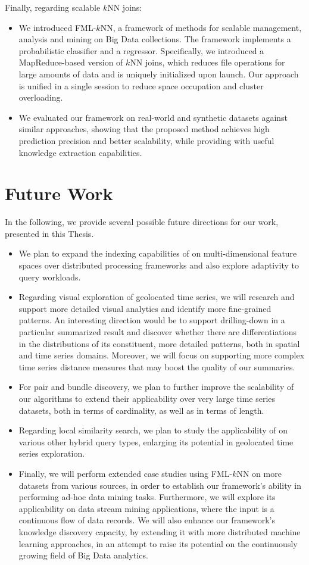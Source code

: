 Finally, regarding scalable $k$NN joins:
\begin{itemize}
	\item We introduced FML-$k$NN, a framework of methods for scalable management, analysis and mining on Big Data collections. The framework implements a probabilistic classifier and a regressor. Specifically, we introduced a MapReduce-based version of $k$NN joins, which reduces file operations for large amounts of data and is uniquely initialized upon launch. Our approach is unified in a single session to reduce space occupation and cluster overloading.
	\item We evaluated our framework on real-world and synthetic datasets against similar approaches, showing that the proposed method achieves high prediction precision and better scalability, while providing with useful knowledge extraction capabilities.
\end{itemize}

\section{Future Work}
\label{sec:future}
In the following, we provide several possible future directions for our work, presented in this Thesis.

\begin{itemize}
	\item We plan to expand the indexing capabilities of \btsr on multi-dimensional feature spaces over distributed processing frameworks and also explore adaptivity to query workloads.
	\item Regarding visual exploration of geolocated time series, we will research and support more detailed visual analytics and identify more fine-grained patterns. An interesting direction would be to support drilling-down in a particular summarized result and discover whether there are differentiations in the distributions of its constituent, more detailed patterns, both in spatial and time series domains. Moreover, we will focus on supporting more complex time series distance measures that may boost the quality of our summaries.
	\item For pair and bundle discovery, we plan to further improve the scalability of our algorithms to extend their applicability over very large time series datasets, both in terms of cardinality, as well as in terms of length.
	\item Regarding local similarity search, we plan to study the applicability of \sbtsr on various other hybrid query types, enlarging its potential in geolocated time series exploration.
	\item Finally, we will perform extended case studies using FML-$k$NN on more datasets from various sources, in order to establish our framework's ability in performing ad-hoc data mining tasks. Furthermore, we will explore its applicability on data stream mining applications, where the input is a continuous flow of data records. We will also enhance our framework's knowledge discovery capacity, by extending it with more distributed machine learning approaches, in an attempt to raise its potential on the continuously growing field of Big Data analytics.
\end{itemize}